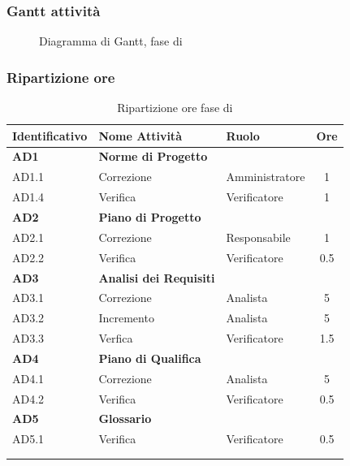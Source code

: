 \subsubsection{Gantt attività}
\begin{figure}[H]
	\centering
	\caption{Diagramma di Gantt, fase di \AD}
\end{figure}

\subsubsection{Ripartizione ore}
\bgroup
\begin{longtable}{|l|l|l|c|}
	\endfirsthead
	\hline
	\textbf{Identificativo} &
	\textbf{Nome Attività} &
	\textbf{Ruolo} &
	\textbf{Ore}\\
	\endhead
	\hline
	\textbf{AD1} & \textbf{Norme di Progetto} &  &  \\
		\hline
		{AD1.1} & {Correzione} & Amministratore  & 1\\
		\hline
		{AD1.4} & {Verifica} & Verificatore & 1 \\
		\hline
	\textbf{AD2} & \textbf{Piano di Progetto}  & & \\
	\hline
		{AD2.1} & {Correzione} & Responsabile &  1\\
		\hline
		{AD2.2} & {Verifica} & Verificatore & 0.5 \\
		\hline
	\textbf{AD3} & \textbf{Analisi dei Requisiti} & &  \\
		\hline
		{AD3.1} & {Correzione} & Analista  &  5\\
		\hline
		{AD3.2} & {Incremento} & Analista  &  5\\
		\hline
		{AD3.3} & {Verfica} & Verificatore  &  1.5\\
		\hline
	\textbf{AD4} & \textbf{Piano di Qualifica} & &  \\
	\hline
		{AD4.1} & {Correzione} & Analista &  5 \\
		\hline
		{AD4.2} & {Verifica} & Verificatore &  0.5 \\
		\hline
	\textbf{AD5} & \textbf{Glossario} & &  \\
	\hline
		{AD5.1} & {Verifica} & Verificatore &  0.5 \\
	\hline
	\\
	\caption{Ripartizione ore fase di \AD}
\end{longtable}
\egroup


